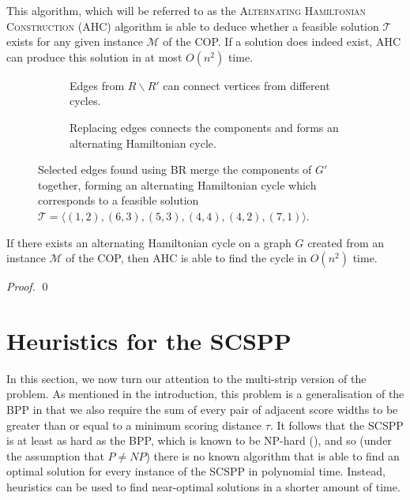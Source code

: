 \documentclass[oribibl]{llncs}
\begin{document}
This algorithm, which will be referred to as the \textsc{Alternating Hamiltonian Construction} (AHC) algorithm is able to deduce whether a feasible solution $\mathcal{T}$ exists for any given instance $\mathcal{M}$ of the COP. If a solution does indeed exist, AHC can produce this solution in at most $O(n^2)$ time.

\begin{figure}	
	\centering
	\begin{subfigure}[H]{0.7\textwidth}
		
		\caption{Edges from $R\backslash R'$ can connect vertices from different cycles.}	
		\label{fig:mpsconnect} \vspace{5mm}
	\end{subfigure}
	\begin{subfigure}[H]{0.7\textwidth}
		
		\caption{Replacing edges connects the components and forms an alternating Hamiltonian cycle.}	
		\label{fig:mpscycle}
	\end{subfigure}
	\caption{Selected edges found using BR merge the components of $G'$ together, forming an alternating Hamiltonian cycle which corresponds to a feasible solution $\mathcal{T} = \langle(1,2), (6,3), (5,3), (4,4), (4,2), (7,1) \rangle$.}
	\label{fig:connect/cycle}
\end{figure}


\begin{theorem}
	\label{thm:copsoln}
	If there exists an alternating Hamiltonian cycle on a graph $G$ created from an instance $\mathcal{M}$ of the COP, then AHC is able to find the cycle in $O(n^2)$ time.
\end{theorem}
\begin{proof}
	\qed
\end{proof}


\section{Heuristics for the SCSPP}
\label{sec:scsppsoln}

In this section, we now turn our attention to the multi-strip version of the problem. As mentioned in the introduction, this problem is a generalisation of the BPP in that we also require the sum of every pair of adjacent score widths to be greater than or equal to a minimum scoring distance $\tau$. It follows that the SCSPP is at least as hard as the BPP, which is known to be NP-hard (\citealp{garey1979}), and so (under the assumption that $P \neq NP$) there is no known algorithm that is able to find an optimal solution for every instance of the SCSPP in polynomial time. Instead, heuristics can be used to find near-optimal solutions in a shorter amount of time.
\end{document}

